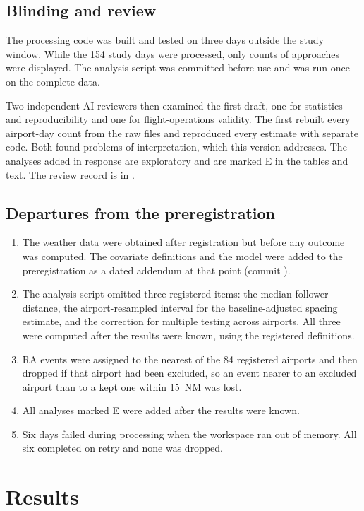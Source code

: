 \documentclass[11pt]{article}
\begin{document}
\subsection{Blinding and review}

The processing code was built and tested on three days outside the study window. While the 154 study days were processed, only counts of approaches were displayed. The analysis script was committed before use and was run once on the complete data.

Two independent AI reviewers then examined the first draft, one for statistics and reproducibility and one for flight-operations validity. The first rebuilt every airport-day count from the raw files and reproduced every estimate with separate code. Both found problems of interpretation, which this version addresses. The analyses added in response are exploratory and are marked E in the tables and text. The review record is in .

\subsection{Departures from the preregistration}\label{sec:deviations}

\begin{enumerate}
\item The weather data were obtained after registration but before any outcome was computed. The covariate definitions and the model were added to the preregistration as a dated addendum at that point (commit ).
\item The analysis script omitted three registered items: the median follower distance, the airport-resampled interval for the baseline-adjusted spacing estimate, and the correction for multiple testing across airports. All three were computed after the results were known, using the registered definitions.
\item RA events were assigned to the nearest of the 84 registered airports and then dropped if that airport had been excluded, so an event nearer to an excluded airport than to a kept one within 15~NM was lost.
\item All analyses marked E were added after the results were known.
\item Six days failed during processing when the workspace ran out of memory. All six completed on retry and none was dropped.
\end{enumerate}

\section{Results}\label{sec:results}
\end{document}
